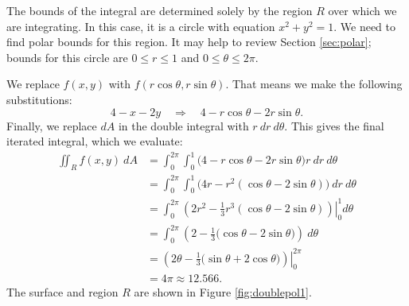 {The bounds of the integral are determined solely by the region $R$ over which we are integrating. In this case, it is a circle with equation $x^2+y^2=1$. We need to find polar bounds for this region. It may help to review Section \ref{sec:polar}; bounds for this circle are $0\leq r\leq 1$ and $0\leq \theta\leq 2\pi$.

We replace $f(x,y)$ with $f(r\cos\theta,r\sin\theta)$. That means we make the following substitutions:
$$4-x-2y \quad \Rightarrow \quad 4-r\cos\theta-2r\sin\theta.$$
Finally, we replace $dA$ in the double integral with $r\ dr\ d\theta$. This gives the final iterated integral, which we evaluate:
\begin{align*}
\iint_Rf(x,y)\ dA &= \int_0^{2\pi}\int_0^1\big(4-r\cos\theta-2r\sin\theta\big)r\ dr\ d\theta\\
						&= \int_0^{2\pi}\int_0^1\big(4r-r^2(\cos\theta-2\sin\theta)\big)\ dr\ d\theta\\
						&= \int_0^{2\pi}\left.\left(2r^2-\frac13r^3(\cos\theta-2\sin\theta)\right)\right|_0^1d\theta\\
						&= \int_0^{2\pi} \left(2-\frac13\big(\cos\theta-2\sin\theta\big)\right)\ d\theta\\
						&= \left.\left(2\theta -\frac13\big(\sin\theta+2\cos\theta\big)\right)\right|_0^{2\pi} \\
						&= 4\pi \approx 12.566.
\end{align*}
The surface and region $R$ are shown in Figure \ref{fig:doublepol1}.
}\\

